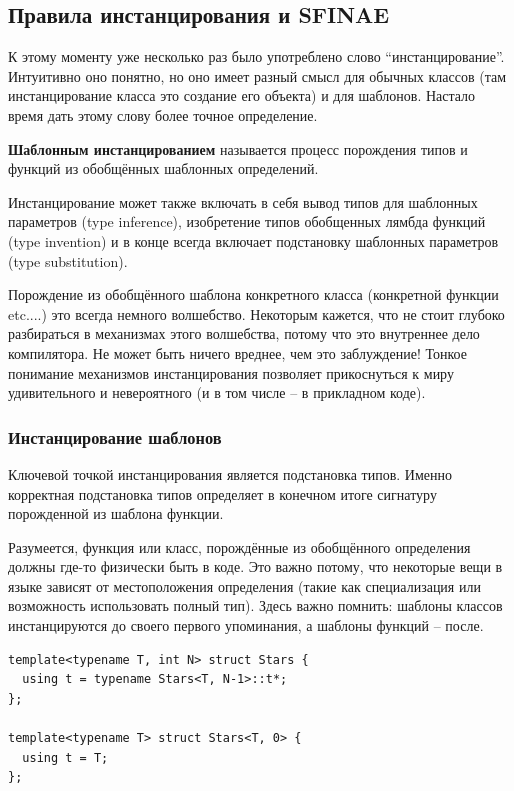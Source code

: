 \documentclass[a4paper,12pt,oneside]{article}
\begin{document}
\pagebreak
\subsection{Правила инстанцирования и SFINAE}\label{SFINAESection}

К этому моменту уже несколько раз было употреблено слово ``инстанцирование''. Интуитивно оно понятно, но оно имеет разный смысл для обычных классов (там инстанцирование класса это создание его объекта) и для шаблонов. Настало время дать этому слову более точное определение.

\textbf{Шаблонным инстанцированием} называется процесс порождения типов и функций из обобщённых шаблонных определений.

Инстанцирование может также включать в себя вывод типов для шаблонных параметров (type inference), изобретение типов обобщенных лямбда функций (type invention) и в конце всегда включает подстановку шаблонных параметров (type substitution).

Порождение из обобщённого шаблона конкретного класса (конкретной функции etc....) это всегда немного волшебство. Некоторым кажется, что не стоит глубоко разбираться в механизмах этого волшебства, потому что это внутреннее дело компилятора. Не может быть ничего вреднее, чем это заблуждение! Тонкое понимание механизмов инстанцирования позволяет прикоснуться к миру удивительного и невероятного (и в том числе -- в прикладном коде).

\subsubsection{Инстанцирование шаблонов}\label{Templateinstancing}

Ключевой точкой инстанцирования является подстановка типов. Именно корректная подстановка типов определяет в конечном итоге сигнатуру порожденной из шаблона функции.

Разумеется, функция или класс, порождённые из обобщённого определения должны где-то физически быть в коде. Это важно потому, что некоторые вещи в языке зависят от местоположения определения (такие как специализация или возможность использовать полный тип). Здесь важно помнить: шаблоны классов инстанцируются до своего первого упоминания, а шаблоны функций -- после.

\begin{lstlisting}
template<typename T, int N> struct Stars {
  using t = typename Stars<T, N-1>::t*;
};

template<typename T> struct Stars<T, 0> {
  using t = T;
};
\end{lstlisting}
\end{document}

